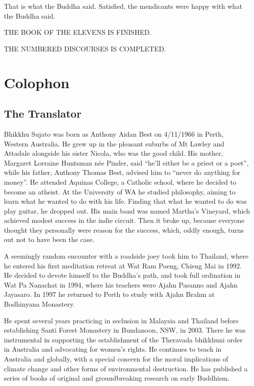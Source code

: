 \documentclass[12pt,openany]{book}%
\newcommand*{\scendbook}[1]{\begin{center}\uppercase{#1}\end{center}}
\let\oldbackmatter\backmatter
\renewcommand{\backmatter}{%
\chapterfont{\setstretch{.85}\normalfont\centering}%
\sectionfont{\setstretch{.85}\Semiboldsubheadfont}%
\oldbackmatter}
\begin{document}
That is what the Buddha said. Satisfied, the mendicants were happy with what the Buddha said. 

\scendbook{The Book of the Elevens is finished. }

\scendbook{The Numbered Discourses is completed. }

%
\backmatter%
\chapter*{Colophon}

\section*{The Translator}

Bhikkhu Sujato was born as Anthony Aidan Best on 4/11/1966 in Perth, Western Australia. He grew up in the pleasant suburbs of Mt Lawley and Attadale alongside his sister Nicola, who was the good child. His mother, Margaret Lorraine Huntsman née Pinder, said “he’ll either be a priest or a poet”, while his father, Anthony Thomas Best, advised him to “never do anything for money”. He attended Aquinas College, a Catholic school, where he decided to become an atheist. At the University of WA he studied philosophy, aiming to learn what he wanted to do with his life. Finding that what he wanted to do was play guitar, he dropped out. His main band was named Martha’s Vineyard, which achieved modest success in the indie circuit. Then it broke up, because everyone thought they personally were reason for the success, which, oddly enough, turns out not to have been the case. 

A seemingly random encounter with a roadside joey took him to Thailand, where he entered his first meditation retreat at Wat Ram Poeng, Chieng Mai in 1992. He decided to devote himself to the Buddha’s path, and took full ordination in Wat Pa Nanachat in 1994, where his teachers were Ajahn Pasanno and Ajahn Jayasaro. In 1997 he returned to Perth to study with Ajahn Brahm at Bodhinyana Monastery. 

He spent several years practicing in seclusion in Malaysia and Thailand before establishing Santi Forest Monastery in Bundanoon, NSW, in 2003. There he was instrumental in supporting the establishment of the Theravada bhikkhuni order in Australia and advocating for women’s rights. He continues to teach in Australia and globally, with a special concern for the moral implications of climate change and other forms of environmental destruction. He has published a series of books of original and groundbreaking research on early Buddhism. 
\end{document}
